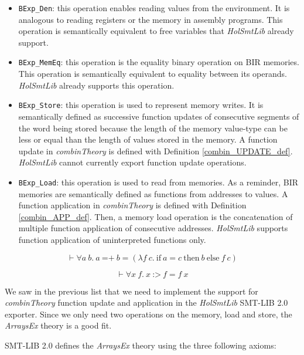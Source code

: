 \documentclass{kththesis}
\begin{document}
{\begin{itemize}
    \item \texttt{BExp\_Den}: this operation enables reading values from the environment. It is analogous to reading registers or the memory in assembly programs. This operation is semantically equivalent to free variables that \textit{HolSmtLib} already support.
    \item \texttt{BExp\_MemEq}: this operation is the equality binary operation on BIR memories. This operation is semantically equivalent to equality between its operands. \textit{HolSmtLib} already supports this operation.
    \item \texttt{BExp\_Store}: this operation is used to represent memory writes. It is semantically defined as successive function updates of consecutive segments of the word being stored because the length of the memory value-type can be less or equal than the length of values stored in the memory. A function update in \textit{combinTheory} is defined with Definition \ref{combin_UPDATE_def}. \textit{HolSmtLib} cannot currently export function update operations.
    \item \texttt{BExp\_Load}: this operation is used to read from memories. As a reminder, BIR memories are semantically defined as functions from addresses to values. A function application in \textit{combinTheory} is defined with Definition \ref{combin_APP_def}. Then, a memory load operation is the concatenation of multiple function application of consecutive addresses. \textit{HolSmtLib} supports function application of uninterpreted functions only.
\end{itemize}

\begin{equation}
    \vdash \forall a~b.~a~\text{=+}~b = (\lambda f~c.~\text{if}~a = c~\text{then}~b~\text{else}~f~c)
    \label{combin_UPDATE_def}
\end{equation}

\begin{equation}
    \vdash \forall x~f.~x~\text{:>}~f = f~x
    \label{combin_APP_def}
\end{equation}

We saw in the previous list that we need to implement the support for \textit{combinTheory} function update and application in the \textit{HolSmtLib} SMT-LIB 2.0 exporter. Since we only need two operations on the memory, load and store, the \textit{ArraysEx} theory is a good fit.

SMT-LIB 2.0 \cite{barrett_satisfiability_2016} defines the \textit{ArraysEx} theory using the three following axioms:

}
\end{document}
